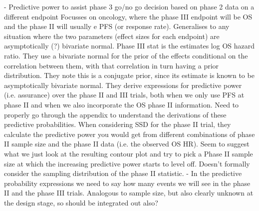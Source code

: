 \documentclass{article} %
\begin{document}
\cite{Hong2012} - Predictive power to assist phase 3 go/no go decision based on phase 2 data on a different endpoint
Focusses on oncology, where the phase III endpoint will be OS and the phase II will usually e PFS (or response rate). Generalises to any situation where the two parameters (effect sizes for each endpoint) are asymptotically (?) bivariate normal. Phase III stat is the estimates log OS hazard ratio. They use a bivariate normal for the prior of the effects conditional on the correlation between them, with that correlation in turn having a prior distribution. They note this is a conjugate prior, since its estimate is known to be asymptotically bivariate normal. They derive expressions for predictive power (i.e. assurance) over the phase II and III trials, both when we only use PFS at phase II and when we also incorporate the OS phase II information. Need to properly go through the appendix to understand the derivations of these predictive probabilities. When considering SSD for the phase II trial, they calculate the predictive power you would get from different combinations of phase II sample size and the phase II data (i.e. the observed OS HR). Seem to suggest what we just look at the resulting contour plot and try to pick a Phase II sample size at which the increasing predictive power starts to level off. Doesn't formally consider the sampling distribution of the phase II statistic.
- In the predictive probability expressions we need to say how many events we will see in the phase II and the phase III trials. Analogous to sample size, but also clearly unknown at the design stage, so should be integrated out also?
\end{document}
